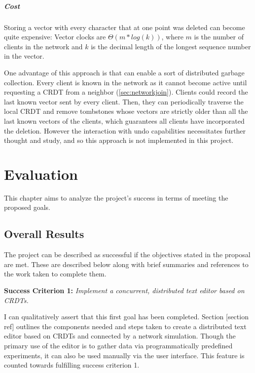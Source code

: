 \documentclass[12pt,a4paper,twoside,openright]{report}
\begin{document}
			
			
			
			
			\paragraph{Cost}
			Storing a vector with every character that at one point was deleted can become quite expensive: Vector clocks are $\Theta (m*log(k))$, where $m$ is the number of clients in the network and $k$ is the decimal length of the longest sequence number in the vector.
			
			One advantage of this approach is that can enable a sort of distributed garbage collection. Every client is known in the network as it cannot become active until requesting a CRDT from a neighbor (\cref{sec:networkjoin}). Clients could record the last known vector sent by every client. Then, they can periodically traverse the local CRDT and remove tombstones whose vectors are strictly older than all the last known vectors of the clients, which guarantees all clients have incorporated the deletion. However the interaction with undo capabilities necessitates further thought and study, and so this approach is not implemented in this project.
			
			
			
			
		


\chapter{Evaluation}
	This chapter aims to analyze the project's success in terms of meeting the proposed goals.

	\section{Overall Results}
	
	The project can be described as successful if the objectives stated in the proposal are met. These are described below along with brief summaries and references to the work taken to complete them.
	
	\textbf{Success Criterion 1:} \textit{Implement a concurrent, distributed text editor based on CRDTs.}
	
	I can qualitatively assert that this first goal has been completed. Section [section ref] outlines the components needed and steps taken to create a distributed text editor based on CRDTs and connected by a network simulation. Though the primary use of the editor is to gather data via programmatically predefined experiments, it can also be used manually via the user interface. This feature is counted towards fulfilling success criterion 1.
	
\end{document}
